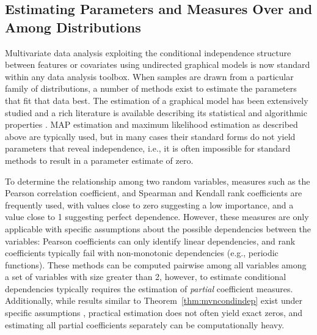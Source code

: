 \subsection{Estimating Parameters and Measures Over and Among Distributions}
Multivariate data analysis exploiting the conditional independence structure between features or covariates using 
undirected graphical models is now standard within any data analysis toolbox. 
When samples are drawn from a particular family of distributions, a number of methods exist to estimate the parameters that fit that data best. 
The estimation of a graphical model
has been extensively studied
and a rich literature is available describing 
its statistical and algorithmic properties \citep{koller2009probabilistic,jordan1998learning}. 
MAP estimation and maximum likelihood estimation as described above are typically used,
but in many cases their standard forms do not yield
parameters that reveal independence, i.e., it is often impossible for standard
methods to result in a parameter estimate of zero.

To determine the relationship among two random variables, measures such as the Pearson correlation coefficient, and Spearman and Kendall rank coefficients \citep{myers2013research} are frequently used, with values close to zero suggesting a low importance, and a value close to 1 suggesting perfect dependence. However,
these measures are only applicable with specific assumptions about the possible dependencies between the variables: Pearson coefficients can only identify linear dependencies, and rank coefficients typically fail with non-monotonic dependencies (e.g., periodic functions). These methods can be computed pairwise among all variables among a set of variables with size greater than 2, however, to estimate conditional dependencies typically requires the estimation of \textit{partial} coefficient measures.
Additionally, while results similar to Theorem~\ref{thm:mvncondindep} exist under specific assumptions ,
practical estimation does not often yield exact zeros,
and estimating all partial coefficients separately can be computationally heavy.

